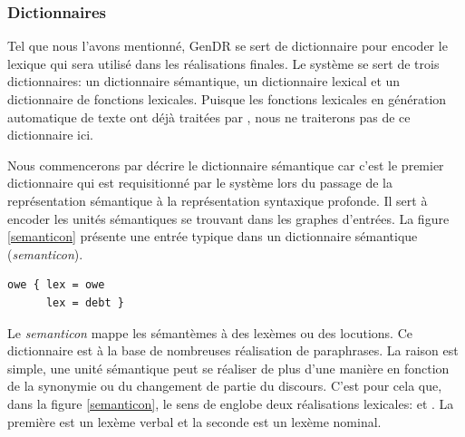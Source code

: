\subsubsection{Dictionnaires}\label{dictio}

Tel que nous l'avons mentionné, GenDR se sert de dictionnaire pour encoder le lexique qui sera utilisé dans les réalisations finales. Le système se sert de trois dictionnaires: un dictionnaire sémantique, un dictionnaire lexical et un dictionnaire de fonctions lexicales. Puisque les fonctions lexicales en génération automatique de texte ont déjà traitées par \cite{LambreyImplementationcollocationspour2017}, nous ne traiterons pas de ce dictionnaire ici. 

Nous commencerons par décrire le dictionnaire sémantique car c'est le premier dictionnaire qui est requisitionné par le système lors du passage de la représentation sémantique à la représentation syntaxique profonde. Il sert à encoder les unités sémantiques se trouvant dans les graphes d'entrées. La figure \ref{semanticon} présente une entrée typique dans un dictionnaire sémantique (\emph{semanticon}).

\begin{lstlisting}[language=Xml, caption=Semanticon, label=semanticon]
owe { lex = owe
      lex = debt }
\end{lstlisting}

Le \emph{semanticon} mappe les sémantèmes à des lexèmes ou des locutions. Ce dictionnaire est à la base de nombreuses réalisation de paraphrases. La raison est simple, une unité sémantique peut se réaliser de plus d'une manière en fonction de la synonymie ou du changement de partie du discours. C'est pour cela que, dans la figure \ref{semanticon}, le sens de  englobe deux réalisations lexicales:  et . La première est un lexème verbal et la seconde est un lexème nominal.

